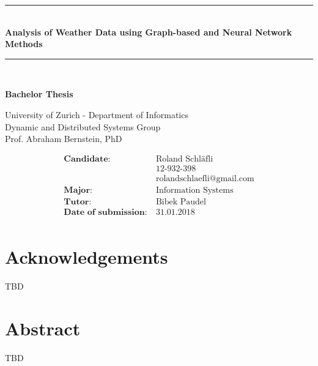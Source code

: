 \documentclass[a4paper, twoside, openright]{report}
\newcommand{\HRule}{\rule{\linewidth}{0.3mm}} %
\begin{document}
\begin{titlepage}
\HRule \\[0.4cm]
{\LARGE \textbf{Analysis of Weather Data using Graph-based and Neural Network Methods}}
\HRule \\[1.5cm]

\vspace*{1\baselineskip}

{\large \textbf{Bachelor Thesis}}

\vspace*{1\baselineskip}

\large University of Zurich - Department of Informatics \\ \vspace{3.5mm}
\large Dynamic and Distributed Systems Group \\ \vspace{3.5mm}
\large Prof. Abraham Bernstein, PhD

\vspace*{0.5\baselineskip}

\begin{align*}
\textbf{Candidate:} &\ \text{Roland Schläfli} \\
&\ \text{12-932-398} \\
&\ \text{rolandschlaefli@gmail.com} \\
\textbf{Major:} &\ \text{Information Systems} \\
\textbf{Tutor:} &\ \text{Bibek Paudel} \\
\textbf{Date of submission:} &\ \text{31.01.2018} \\
\end{align*}

\endgroup
\end{titlepage}

\newpage


\chapter*{Acknowledgements}
TBD

\chapter*{Abstract}
TBD

\end{document}
